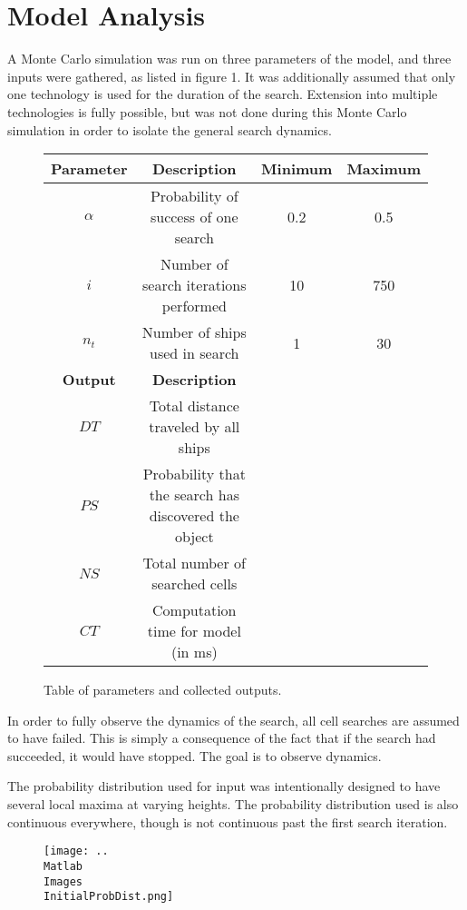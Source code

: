 \section{Model Analysis}

A Monte Carlo simulation was run on three parameters of the model, and three inputs were gathered, as listed in figure 1. It was additionally assumed that only one technology is used for the duration of the search. Extension into multiple technologies is fully possible, but was not done during this Monte Carlo simulation in order to isolate the general search dynamics.

\begin{figure}[H]\begin{center}\begin{tabular}{|c|c|c|c|}
\hline \textbf{Parameter} & \textbf{Description} & \textbf{Minimum} & \textbf{Maximum}\\\hline\hline
$\alpha$ & Probability of success of one search & 0.2 & 0.5 \\\hline
$i$ & Number of search iterations performed & 10 & 750 \\\hline
$n_t$ & Number of ships used in search & 1 & 30 \\\hline\hline
\textbf{Output} & \textbf{Description} &&\\\hline
$DT$ & Total distance traveled by all ships &&\\\hline
$PS$ & Probability that the search has discovered the object &&\\\hline
$NS$ & Total number of searched cells &&\\\hline
$CT$ & Computation time for model (in ms) &&\\\hline
\end{tabular}\end{center}
\caption{Table of parameters and collected outputs.}
\end{figure}

In order to fully observe the dynamics of the search, all cell searches are assumed to have failed. This is simply a consequence of the fact that if the search had succeeded, it would have stopped. The goal is to observe dynamics.

The probability distribution used for input was intentionally designed to have several local maxima at varying heights. The probability distribution used is also continuous everywhere, though is not continuous past the first search iteration.

\begin{figure}[H]\begin{center}
\texttt{[image: ..\\Matlab\\Images\\InitialProbDist.png]}
\end{center}\end{figure}